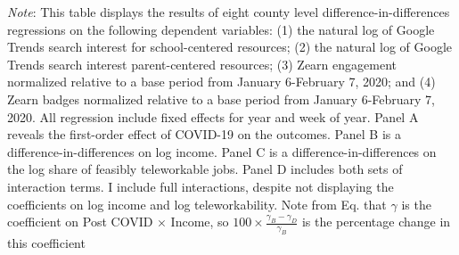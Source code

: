 \begin{table}[hbtp!]
    \caption{Teleworkability is a factor in the COVID-induced income inequalities in educational outcomes}
    \label{tab:inctele}
  \centering
  \begin{minipage}{\textwidth}
      \footnotesize
      \textit{Note}: This table displays the results of eight county level difference-in-differences regressions on the following dependent variables: (1) the natural log of Google Trends search interest for school-centered resources; (2) the natural log of Google Trends search interest parent-centered resources;  (3) Zearn engagement normalized relative to a base period from January 6-February 7,  2020; and (4) Zearn badges normalized relative to a base period from January 6-February 7,  2020. All regression include fixed effects for year and week of year.
      Panel A reveals the first-order effect of COVID-19 on the outcomes.
      Panel B is a difference-in-differences on log income.
      Panel C is a difference-in-differences on the log share of feasibly teleworkable jobs.
      Panel D includes both sets of interaction terms.
      I include full interactions, despite not displaying the coefficients on log income and log teleworkability.
      Note from Eq.  that $\gamma$ is the coefficient on Post COVID $\times$ Income, so
      $100 \times \frac{\gamma_B-\gamma_D}{\gamma_B}$ is the percentage change in this coefficient

\end{minipage}
\end{table}
